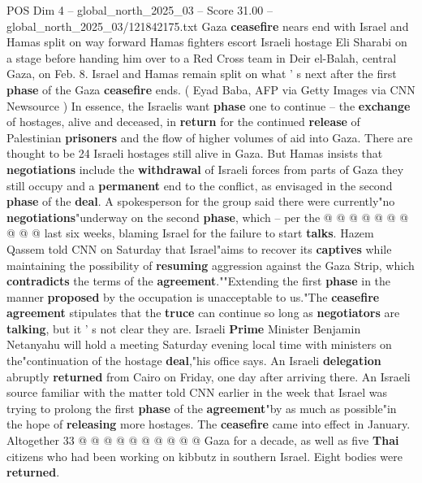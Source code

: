 \begin{textsample}{POS Dim 4 – global\_north\_2025\_03 – Score 31.00 – global\_north\_2025\_03/121842175.txt}  \label{ex:f4_pos_065}
Gaza \textbf{ceasefire} nears end with Israel and Hamas split on way forward Hamas fighters escort Israeli hostage Eli Sharabi on a stage before handing him over to a Red Cross team in Deir el-Balah, central Gaza, on Feb. 8.
Israel and Hamas remain split on what ' s next after the first \textbf{phase} of the Gaza \textbf{ceasefire} ends. ( Eyad Baba, AFP via Getty Images via CNN Newsource ) In essence, the Israelis want \textbf{phase} one to continue -- the \textbf{exchange} of hostages, alive and deceased, in \textbf{return} for the continued \textbf{release} of Palestinian \textbf{prisoners} and the flow of higher volumes of aid into Gaza.
There are thought to be 24 Israeli hostages still alive in Gaza.
But Hamas insists that \textbf{negotiations} include the \textbf{withdrawal} of Israeli forces from parts of Gaza they still occupy and a \textbf{permanent} end to the conflict, as envisaged in the second \textbf{phase} of the \textbf{deal}.
A spokesperson for the group said there were currently"no \textbf{negotiations}"underway on the second \textbf{phase}, which -- per the @ @ @ @ @ @ @ @ @ @ last six weeks, blaming Israel for the failure to start \textbf{talks}.
Hazem Qassem told CNN on Saturday that Israel"aims to recover its \textbf{captives} while maintaining the possibility of \textbf{resuming} aggression against the Gaza Strip, which \textbf{contradicts} the terms of the \textbf{agreement}.""Extending the first \textbf{phase} in the manner \textbf{proposed} by the occupation is unacceptable to us."The \textbf{ceasefire} \textbf{agreement} stipulates that the \textbf{truce} can continue so long as \textbf{negotiators} are \textbf{talking}, but it ' s not clear they are.
Israeli \textbf{Prime} Minister Benjamin Netanyahu will hold a meeting Saturday evening local time with ministers on the"continuation of the hostage \textbf{deal},"his office says.
An Israeli \textbf{delegation} abruptly \textbf{returned} from Cairo on Friday, one day after arriving there.
An Israeli source familiar with the matter told CNN earlier in the week that Israel was trying to prolong the first \textbf{phase} of the \textbf{agreement}"by as much as possible"in the hope of \textbf{releasing} more hostages.
The \textbf{ceasefire} came into effect in January.
Altogether 33 @ @ @ @ @ @ @ @ @ @ Gaza for a decade, as well as five \textbf{Thai} citizens who had been working on kibbutz in southern Israel.
Eight bodies were \textbf{returned}.

\end{textsample}
